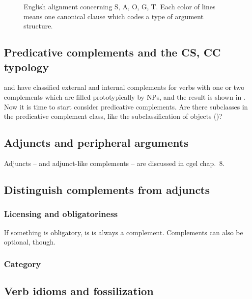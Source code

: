 \documentclass{article}
\newcommand*{\citechap}[1]{chap.~{#1}}
\begin{document}
\begin{figure}
    \centering
    
    \caption{English alignment concerning S, A, O, G, T. Each color of lines means one canonical clause which codes a type of argument structure.}
    \label{fig:ditransitive-gt}
\end{figure}

\subsection{Predicative complements and the CS, CC typology}

 and  
have classified external and internal complements for verbs with one or two complements
which are filled prototypically by NPs,
and the result is shown in . 
Now it is time to start consider predicative complements.
Are there subclasses in the predicative complement class, 
like the subclassification of objects ()?


\subsection{Adjuncts and peripheral arguments}\label{sec:adjuncts-classification}

Adjuncts -- and adjunct-like complements -- are discussed in \ac{cgel} \citechap{8}.

\subsection{Distinguish complements from adjuncts}\label{sec:recognizing-complement-clause}

\subsubsection{Licensing and obligatoriness}

If something is obligatory, is is always a complement.
Complements can also be optional, though.


\subsubsection{Category}

\subsection{Verb idioms and fossilization}
\end{document}
